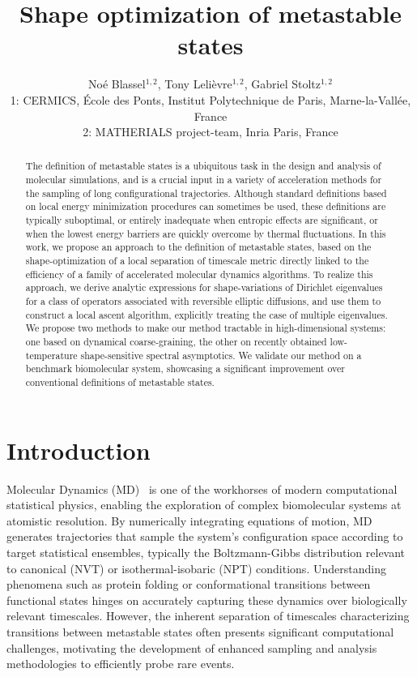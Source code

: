 \documentclass[a4]{article}
\title{Shape optimization of metastable states}
\author{No\'e Blassel$^{1,2}$, Tony Leli\`evre$^{1,2}$, Gabriel Stoltz$^{1,2}$\\
   \small 1: CERMICS, \'Ecole des Ponts, Institut Polytechnique de Paris, Marne-la-Vall\'ee, France  \\
   \small 2: MATHERIALS project-team, Inria Paris, France}
\newcommand{\1}{\mathbbm 1}
\begin{document}
\maketitle
\begin{abstract}
    The definition of metastable states is a ubiquitous task in the design and analysis of molecular simulations, and is a crucial input in a variety of acceleration methods for the sampling of long configurational trajectories.
    Although standard definitions based on local energy minimization procedures can sometimes be used, these definitions are typically suboptimal, or entirely inadequate when entropic effects are significant, or when the lowest energy barriers are quickly overcome by thermal fluctuations.
    In this work, we propose an approach to the definition of metastable states, based on the shape-optimization of a local separation of timescale metric directly linked to the efficiency of a family of accelerated molecular dynamics algorithms.
    To realize this approach, we derive analytic expressions for shape-variations of Dirichlet eigenvalues for a class of operators associated with reversible elliptic diffusions, and use them to construct a local ascent algorithm, explicitly treating the case of multiple eigenvalues.
    We propose two methods to make our method tractable in high-dimensional systems: one based on dynamical coarse-graining, the other on recently obtained low-temperature shape-sensitive spectral asymptotics.
    We validate our method on a benchmark biomolecular system, showcasing a significant improvement over conventional definitions of metastable states.
\end{abstract}
\tableofcontents

\section{Introduction}
    \label{sec:intro}
    Molecular Dynamics (MD)~\cite{AT17,LM16} is one of the workhorses of modern computational statistical physics, enabling the exploration of complex biomolecular systems at atomistic resolution.
    By numerically integrating equations of motion, MD generates trajectories that sample the system's configuration space according to target statistical ensembles, typically the Boltzmann-Gibbs distribution relevant to canonical (NVT) or isothermal-isobaric (NPT) conditions.
    Understanding phenomena such as protein folding or conformational transitions between functional states hinges on accurately capturing these dynamics over biologically relevant timescales.
    However, the inherent separation of timescales characterizing transitions between metastable states often presents significant computational challenges, motivating the development of enhanced sampling and analysis methodologies to efficiently probe rare events.
\end{document}
